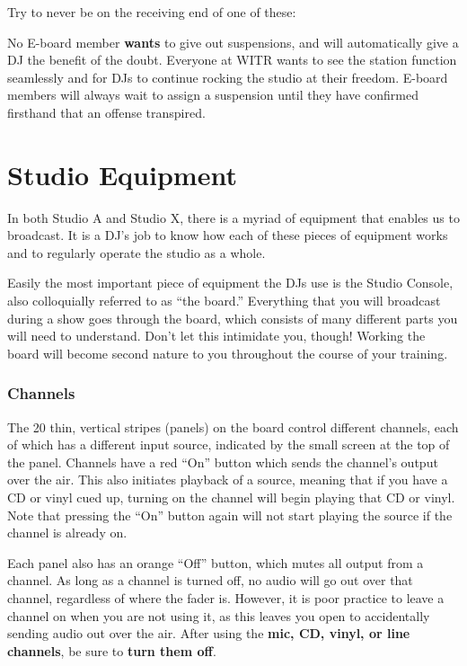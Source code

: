 \documentclass{witrman}
\begin{document}
Try to never be on the receiving end of one of these:


No E-board member \textbf{wants} to give out suspensions, and will automatically
give a DJ the benefit of the doubt.  Everyone at WITR wants to see the station
function seamlessly and for DJs to continue rocking the studio at their freedom.
E-board members will always wait to assign a suspension until they have
confirmed firsthand that an offense transpired.


\chapter{Studio Equipment}

In both Studio A and Studio X, there is a myriad of equipment that enables us to
broadcast.  It is a DJ's job to know how each of these pieces of equipment works
and to regularly operate the studio as a whole.


Easily the most important piece of equipment the DJs use is the Studio Console,
also colloquially referred to as ``the board.''  Everything that you will
broadcast during a show goes through the board, which consists of many different
parts you will need to understand.  Don't let this intimidate you, though!
Working the board will become second nature to you throughout the course of your
training.


\subsection{Channels}

The 20 thin, vertical stripes (panels) on the board control different channels,
each of which has a different input source, indicated by the small screen at the
top of the panel.  Channels have a red ``On'' button which sends the channel's
output over the air.  This also initiates playback of a source, meaning that if
you have a CD or vinyl cued up, turning on the channel will begin playing that
CD or vinyl.  Note that pressing the ``On'' button again will not start playing
the source if the channel is already on.

Each panel also has an orange ``Off'' button, which mutes all output from a
channel.  As long as a channel is turned off, no audio will go out over that
channel, regardless of where the fader is.  However, it is poor practice to
leave a channel on when you are not using it, as this leaves you open to
accidentally sending audio out over the air.  After using the \textbf{mic, CD,
vinyl, or line channels}, be sure to \textbf{turn them off}.
\end{document}
